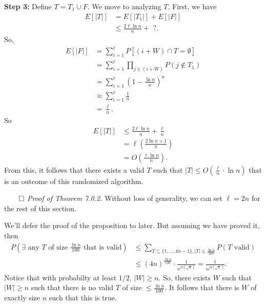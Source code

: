 \documentclass{report}
\begin{document}
\noindent \textbf{Step 3:} Define $T = T_1 \cup F$. 
\noindent We move to analyzing $T$. First, we have 
\begin{align*}
    E[|T|] &= E[|T_1|] + E[|F|] \\
    &\leq \frac{2\ell \ln n}{n} + \text{ ?}.
\end{align*}
So,
\begin{align*}
    E[|F|] &= \sum_{i=1}^\ell P[(i + W) \cap T = \emptyset] \\
    &= \sum_{i=1}^\ell  \prod_{j \in (i + W)} P(j \notin T_1) \\
    &= \sum_{i = 1}^\ell \left( 1 - \frac{\ln n}{n}\right)^n \\
    &\approx \sum_{i=1}^\ell \frac 1n \\
    &= \frac \ell n.
\end{align*}
So 
\begin{align*}
    E[|T|] &\leq \frac{2\ell \ln n}{n} + \frac \ell n \\
    &= \ell \left( \frac{2 \ln n + 1}{n} \right) \\
    &= O \left( \frac{\ell \ln n}{n} \right).
\end{align*}
From this, it follows that there exists a valid $T$ such that $|T| \leq O\left( \frac{\ell}{n} \cdot \ln n \right)$ that is an outcome of this randomized algorithm. 

\hfill $\qed$
\newpage
\noindent \textit{Proof of Theorem 7.0.2.} Without loss of generality, we can set $\ell = 2n$ for the rest of this section. 

\noindent We'll defer the proof of the proposition to later. But assuming we have proved it, then 
\begin{align*}
    P\left(\exists \text{ any $T$ of size $\frac{\ln n}{100}$ that is valid}\right) &\leq \sum_{T\subseteq \{1, \ldots, 4n-1\}, |T| \leq \frac{\ln n}{100}} P(T \text{ valid}) \\
    &\leq \left(4n\right)^{\frac{\ln n}{100}} \cdot \frac{1}{n^{\Omega(\sqrt n)}} = \frac{1}{n^{\Omega(\sqrt n)}}.
\end{align*}
Notice that with probabilty at least $1/2$, $|W| \geq n$. So, there exists $W$ such that $|W| \geq n$ such that there is no valid $T$ of size $\leq \frac{\ln n}{100}$. It follows that there is $W$ of exactly size $n$ such that this is true. 
\end{document}

